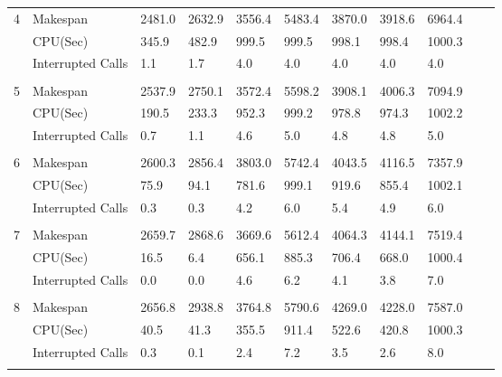 \documentclass[runningheads]{llncs}
\begin{document}
\begin{table}[!h]
{\begin{minipage}{\textwidth}
\begin{tabular}{l l l l l l l l l l l}
    4                & Makespan             & 2481.0	& 2632.9   & 3556.4	     & 5483.4	   & 3870.0	 & 3918.6  & 6964.4 \\
                     & CPU(Sec)             & 345.9	    & 482.9	   & 999.5	     & 999.5	   & 998.1	 & 998.4   & 1000.3 \\
                     & Interrupted Calls    & 1.1	    & 1.7      & 4.0	     & 4.0	       & 4.0	 & 4.0     & 4.0 \\\\
                     
    5                & Makespan             & 2537.9	& 2750.1   & 3572.4	     & 5598.2	   & 3908.1	 & 4006.3  & 7094.9 \\
                     & CPU(Sec)             & 190.5	    & 233.3	   & 952.3	     & 999.2	   & 978.8	 & 974.3   & 1002.2 \\
                     & Interrupted Calls    & 0.7	    & 1.1      & 4.6	     & 5.0	       & 4.8	 & 4.8     & 5.0 \\\\
                     
    6                & Makespan             & 2600.3	& 2856.4   & 3803.0	     & 5742.4	   & 4043.5	 & 4116.5  & 7357.9 \\
                     & CPU(Sec)             & 75.9	    & 94.1	   & 781.6	     & 999.1	   & 919.6	 & 855.4   & 1002.1 \\
                     & Interrupted Calls    & 0.3	    & 0.3      & 4.2	     & 6.0	       & 5.4	 & 4.9     & 6.0 \\\\
                     
    7                & Makespan             & 2659.7	& 2868.6   & 3669.6	     & 5612.4	   & 4064.3	 & 4144.1  & 7519.4 \\
                     & CPU(Sec)             & 16.5	    & 6.4	   & 656.1	     & 885.3	   & 706.4	 & 668.0   & 1000.4 \\
                     & Interrupted Calls    & 0.0	    & 0.0      & 4.6	     & 6.2	       & 4.1	 & 3.8     & 7.0 \\\\
                     
    8                & Makespan             & 2656.8	& 2938.8   & 3764.8	     & 5790.6	   & 4269.0	 & 4228.0  & 7587.0 \\
                     & CPU(Sec)             & 40.5	    & 41.3	   & 355.5	     & 911.4	   & 522.6	 & 420.8   & 1000.3 \\
                     & Interrupted Calls    & 0.3	    & 0.1      & 2.4	     & 7.2	       & 3.5	 & 2.6     & 8.0 \\\\
                     

\end{tabular}
\end{minipage}}
\end{table}
\end{document}
